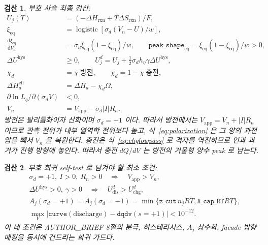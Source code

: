 \documentclass[11pt,a4paper]{article}
\newtheorem*{verifybox}{검산}
\newcommand{\dd}{\mathrm{d}}
\newcommand{\app}{\mathrm{app}}
\newcommand{\eq}{\mathrm{eq}}
\newcommand{\eff}{\mathrm{eff}}
\newcommand{\hys}{\mathrm{hys}}
\newcommand{\dis}{\mathrm{dis}}
\newcommand{\chg}{\mathrm{chg}}
\begin{document}
\begin{verifybox}
부호 사슬 최종 검산:
\begin{align}
U_j(T)&=(-\Delta H_{\mathrm{rxn}}+T\Delta S_{\mathrm{rxn}})/F,\label{eq:sign1}\\
\xi_{\eq}&=\operatorname{logistic}[\sigma_d(V_n-U)/w],\label{eq:sign2}\\
\frac{\dd\xi_{\eq}}{\dd V_n}&=\sigma_d\xi_{\eq}(1-\xi_{\eq})/w,\qquad
\texttt{peak\_shape}_{\eq}=\xi_{\eq}(1-\xi_{\eq})/w>0,\label{eq:sign3}\\
\Delta U^\hys&\ge0,\qquad U_j^d=U_j+\frac12\sigma_dh_\eta\gamma\Delta U^\hys,\label{eq:sign4}\\
\chi_d&=\chi\ \text{방전},\qquad \chi_d=1-\chi\ \text{충전},\label{eq:sign5}\\
\Delta H_a^\eff&=\Delta H_a-\chi_d\Omega,\label{eq:sign6}\\
\partial\ln L_q/\partial(\sigma_dV)&<0,\label{eq:sign7}\\
V_n&=V_\app-\sigma_d|I|R_n.\label{eq:sign8}
\end{align}
방전은 탈리튬화이자 산화이며 $\sigma_d=+1$ 이다. 따라서 방전에서는 $V_\app=V_n+|I|R_n$ 이므로 관측 전위가 내부 열역학 전위보다 높고, 식~\eqref{eq:polarization} 은 그 양의 과전압을 빼서 $V_n$ 을 복원한다. 충전은 식~\eqref{eq:chglowpass} 로 격자를 역전하므로 인과 과거가 진행 방향에 놓인다. 따라서 충전 $dQ/dV$ 는 방전의 거울형 양수 peak 로 남는다.
\end{verifybox}

\begin{verifybox}
부호 회귀 self-test 로 남겨야 할 최소 조건:
\begin{align}
&\sigma_d=+1,\ I>0,\ R_n>0
\quad\Longrightarrow\quad V_\app>V_n,\label{eq:selftest1}\\
&\Delta U^\hys>0,\ \gamma>0
\quad\Longrightarrow\quad U^d_{\dis}>U^d_{\chg},\label{eq:selftest2}\\
&A_j(\sigma_d=+1)=A_j(\sigma_d=-1)
=\min\{\texttt{z\_cut}\,n_jRT,\texttt{A\_cap\_RT}RT\},\label{eq:selftest3}\\
&\max_V\left|\texttt{curve}(\mathrm{discharge})-\texttt{dqdv}(s=+1)\right|<10^{-12}.
\label{eq:selftest4}
\end{align}
이 네 조건은 AUTHOR\_BRIEF 8절의 분극, 히스테리시스, $A_j$ 상수화, facade 방향 매핑을 동시에 건드리는 회귀 가드다.
\end{verifybox}
\end{document}
